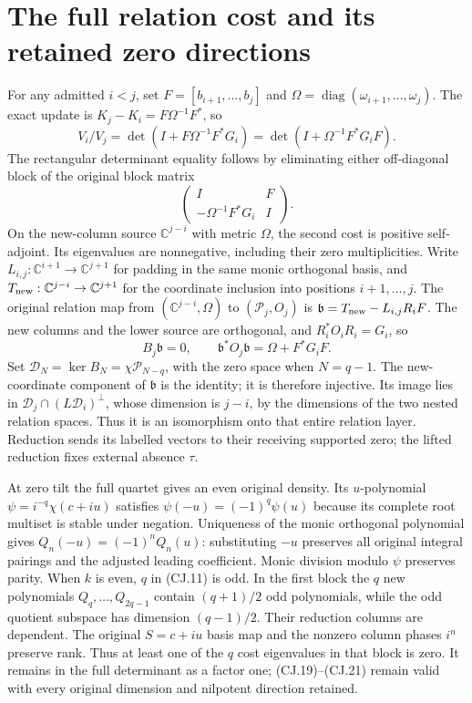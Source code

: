 \documentclass[11pt]{article}
\newcommand{\C}{\mathbb C}
\begin{document}
\section{The full relation cost and its retained zero directions}

For any admitted $i<j$, set $F=[b_{i+1},\ldots,b_j]$ and
$\Omega=\operatorname{diag}(\omega_{i+1},\ldots,\omega_j)$.
The exact update is $K_j-K_i=F\Omega^{-1}F^*$, so
\[
 V_i/V_j=\det(I+F\Omega^{-1}F^*G_i)
         =\det(I+\Omega^{-1}F^*G_iF).
 \tag{CJ.20}
\]
The rectangular determinant equality follows by eliminating either
off-diagonal block of the original block matrix
\[
 \begin{pmatrix}I&F\\-\Omega^{-1}F^*G_i&I\end{pmatrix}.
\]
On the new-column source $\C^{j-i}$ with metric $\Omega$, the
second cost is positive self-adjoint. Its eigenvalues are
nonnegative, including their zero multiplicities.
Write $L_{i,j}:\C^{i+1}\to\C^{j+1}$ for padding in the
same monic orthogonal basis, and
$T_{\rm new}:\C^{j-i}\to\C^{j+1}$ for the coordinate inclusion
into positions $i+1,\ldots,j$. The original relation map from
$(\C^{j-i},\Omega)$ to $(\mathcal P_j,O_j)$ is
$\mathfrak b=T_{\rm new}-L_{i,j}R_iF$.
The new columns and the lower source are orthogonal, and
$R_i^*O_iR_i=G_i$, so
\[
 B_j\mathfrak b=0,\qquad
 \mathfrak b^*O_j\mathfrak b=\Omega+F^*G_iF.
 \tag{CJ.21}
\]
Set $\mathcal D_N=\ker B_N=\chi\mathcal P_{N-q}$, with the
zero space when $N=q-1$. The new-coordinate component of $\mathfrak b$ is the identity;
it is therefore injective. Its image lies in
$\mathcal D_j\cap(L\mathcal D_i)^\perp$, whose dimension is
$j-i$, by the dimensions of the two nested relation spaces.
Thus it is an isomorphism onto that entire relation layer.
Reduction sends its labelled vectors to their receiving supported
zero; the lifted reduction fixes external absence $\tau$.

At zero tilt the full quartet gives an even original density.
Its $u$-polynomial $\psi=i^{-q}\chi(c+iu)$ satisfies
$\psi(-u)=(-1)^q\psi(u)$ because its complete root multiset
is stable under negation. Uniqueness of the monic orthogonal
polynomial gives $Q_n(-u)=(-1)^nQ_n(u)$: substituting $-u$
preserves all original integral pairings and the adjusted leading
coefficient. Monic division modulo $\psi$ preserves parity.
When $k$ is even, $q$ in (CJ.11) is odd. In the first block
the $q$ new polynomials $Q_q,\ldots,Q_{2q-1}$ contain
$(q+1)/2$ odd polynomials, while the odd quotient subspace has
dimension $(q-1)/2$. Their reduction columns are dependent.
The original $S=c+iu$ basis map and the nonzero column phases
$i^n$ preserve rank. Thus at least one of the $q$ cost eigenvalues
in that block is zero. It remains in the full determinant as a
factor one; (CJ.19)--(CJ.21) remain valid with every original
dimension and nilpotent direction retained.
\end{document}
